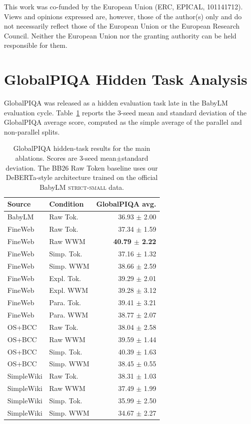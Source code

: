 \documentclass[11pt]{article}
\begin{document}
This work was co-funded by the European Union (ERC, EPICAL, 101141712). Views and opinions expressed are, however, those of the author(s) only and do not necessarily reflect those of the European Union or the European Research Council. Neither the European Union nor the granting authority can be held responsible for them.



\appendix

\section{GlobalPIQA Hidden Task Analysis}
\label{app:gpiqa}

GlobalPIQA \citep{chang2025globalpiqa} was released as a hidden evaluation task late in the BabyLM evaluation cycle. Table~\ref{tab:gpiqa-hidden} reports the 3-seed mean and standard deviation of the GlobalPIQA average score, computed as the simple average of the parallel and non-parallel splits.

\begin{table}[t]
\centering
\scriptsize
\setlength{\tabcolsep}{2pt}
\begin{tabular}{llr}
\toprule
\textbf{Source} & \textbf{Condition} & \textbf{GlobalPIQA avg.} \\
\midrule
BabyLM & Raw Tok. & 36.93 $\pm$ 2.00 \\
\midrule
FineWeb & Raw Tok. & 37.34 $\pm$ 1.59 \\
FineWeb & Raw WWM & \textbf{40.79 $\pm$ 2.22} \\
FineWeb & Simp. Tok. & 37.16 $\pm$ 1.32 \\
FineWeb & Simp. WWM & 38.66 $\pm$ 2.59 \\
FineWeb & Expl. Tok. & 39.29 $\pm$ 2.01 \\
FineWeb & Expl. WWM & 39.28 $\pm$ 3.12 \\
FineWeb & Para. Tok. & 39.41 $\pm$ 3.21 \\
FineWeb & Para. WWM & 38.77 $\pm$ 2.07 \\
\midrule
OS+BCC & Raw Tok. & 38.04 $\pm$ 2.58 \\
OS+BCC & Raw WWM & 39.59 $\pm$ 1.44 \\
OS+BCC & Simp. Tok. & 40.39 $\pm$ 1.63 \\
OS+BCC & Simp. WWM & 38.45 $\pm$ 0.55 \\
\midrule
SimpleWiki & Raw Tok. & 38.31 $\pm$ 1.03 \\
SimpleWiki & Raw WWM & 37.49 $\pm$ 1.99 \\
SimpleWiki & Simp. Tok. & 35.99 $\pm$ 2.50 \\
SimpleWiki & Simp. WWM & 34.67 $\pm$ 2.27 \\
\bottomrule
\end{tabular}
\caption{GlobalPIQA hidden-task results for the main ablations. Scores are 3-seed mean$\pm$standard deviation. The BB26 Raw Token baseline uses our DeBERTa-style architecture trained on the official BabyLM \textsc{strict-small} data.}
\label{tab:gpiqa-hidden}
\end{table}
\end{document}
